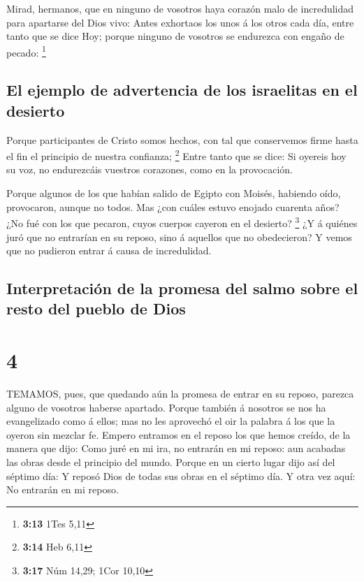  Mirad, hermanos, que en ninguno de vosotros haya corazón
malo de incredulidad para apartarse del Dios vivo:  Antes
exhortaos los unos á los otros cada día, entre tanto que se dice Hoy;
porque ninguno de vosotros se endurezca con engaño de pecado:
\footnote{\textbf{3:13} 1Tes 5,11}

\hypertarget{el-ejemplo-de-advertencia-de-los-israelitas-en-el-desierto}{%
\subsection{El ejemplo de advertencia de los israelitas en el
desierto}\label{el-ejemplo-de-advertencia-de-los-israelitas-en-el-desierto}}

 Porque participantes de Cristo somos hechos, con tal que
conservemos firme hasta el fin el principio de nuestra confianza;
\footnote{\textbf{3:14} Heb 6,11}  Entre tanto que se dice:
Si oyereis hoy su voz, no endurezcáis vuestros corazones, como en la
provocación.

 Porque algunos de los que habían salido de Egipto con
Moisés, habiendo oído, provocaron, aunque no todos.  Mas
¿con cuáles estuvo enojado cuarenta años? ¿No fué con los que pecaron,
cuyos cuerpos cayeron en el desierto? \footnote{\textbf{3:17} Núm 14,29;
  1Cor 10,10}  ¿Y á quiénes juró que no entrarían en su
reposo, sino á aquellos que no obedecieron?  Y vemos que no
pudieron entrar á causa de incredulidad.

\hypertarget{interpretaciuxf3n-de-la-promesa-del-salmo-sobre-el-resto-del-pueblo-de-dios}{%
\subsection{Interpretación de la promesa del salmo sobre el resto del
pueblo de
Dios}\label{interpretaciuxf3n-de-la-promesa-del-salmo-sobre-el-resto-del-pueblo-de-dios}}

\hypertarget{section-3}{%
\section{4}\label{section-3}}

 TEMAMOS, pues, que quedando aún la promesa de entrar en su
reposo, parezca alguno de vosotros haberse apartado.  Porque
también á nosotros se nos ha evangelizado como á ellos; mas no les
aprovechó el oir la palabra á los que la oyeron sin mezclar fe.
 Empero entramos en el reposo los que hemos creído, de la
manera que dijo: Como juré en mi ira, no entrarán en mi reposo: aun
acabadas las obras desde el principio del mundo.  Porque en
un cierto lugar dijo así del séptimo día: Y reposó Dios de todas sus
obras en el séptimo día.  Y otra vez aquí: No entrarán en mi
reposo.

